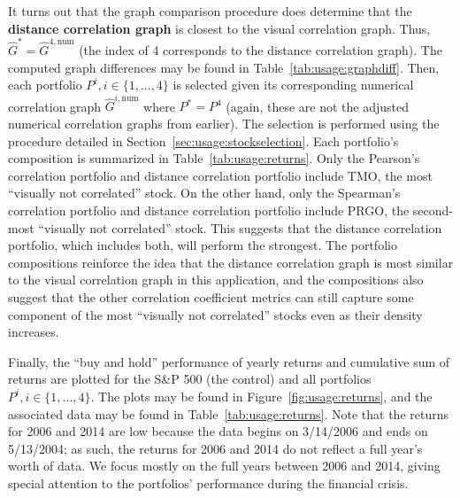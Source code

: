 \newpage
It turns out that the graph comparison procedure does determine that the 
\textbf{distance correlation graph} is closest to the visual correlation graph. 
Thus, $\hat{G}^* = \hat{G}^{4,\text{num}}$ (the index of 4 corresponds to the 
distance correlation graph). 
The computed graph differences may be found in Table~\ref{tab:usage:graphdiff}.
Then, each portfolio $P^i, i\in \{1,...,4\}$ is selected given its 
corresponding numerical correlation graph $\hat{G}^{i,\text{num}}$ where $P^* = 
P^4$ (again, these are not the adjusted numerical correlation graphs from 
earlier). The selection is performed using the procedure detailed in 
Section~\ref{sec:usage:stockselection}. Each portfolio's 
composition is summarized in Table~\ref{tab:usage:returns}. Only the Pearson's 
correlation portfolio and distance correlation portfolio include TMO, the most 
``visually not correlated'' stock. On the other hand, only the Spearman's 
correlation portfolio and distance correlation portfolio include 
PRGO, the second-most ``visually not correlated'' stock. This suggests that the 
distance correlation portfolio, which includes both, will perform the strongest.
The portfolio compositions reinforce the idea that the distance correlation 
graph is most similar to the visual correlation graph in this application, and 
the compositions also suggest that the other correlation coefficient metrics 
can still capture some component of the most ``visually not correlated'' stocks 
even as their density increases.

Finally, the ``buy and hold'' performance of yearly returns and cumulative 
sum of returns are plotted for the S\&P 500 (the control) and
all portfolios $P^i, i \in \{1,...,4\}$. The plots may be found in 
Figure~\ref{fig:usage:returns}, and the associated 
data may be found in Table~\ref{tab:usage:returns}. Note 
that the returns for 2006 and 2014 are low because the data begins 
on 3/14/2006 and ends on 5/13/2004; as such, the returns for 2006 and 2014 do 
not reflect a full year's worth of data. We focus mostly on the 
full years between 2006 and 2014, giving special attention to the portfolios' 
performance during the financial crisis. 


